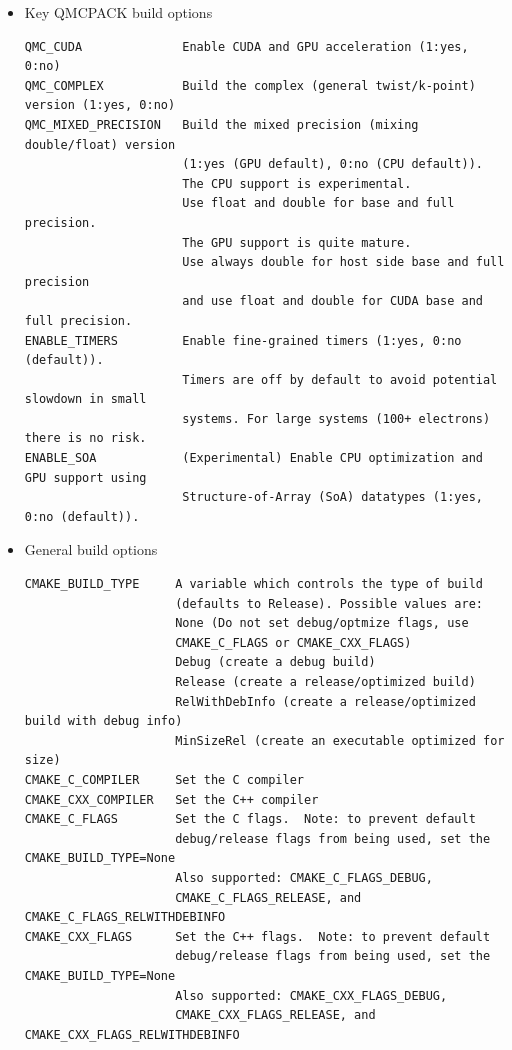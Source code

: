 \begin{itemize}
\item  Key QMCPACK build options
\verbatimfont{\footnotesize}%
\begin{verbatim}
QMC_CUDA              Enable CUDA and GPU acceleration (1:yes, 0:no)
QMC_COMPLEX           Build the complex (general twist/k-point) version (1:yes, 0:no)
QMC_MIXED_PRECISION   Build the mixed precision (mixing double/float) version
                      (1:yes (GPU default), 0:no (CPU default)).
                      The CPU support is experimental.
                      Use float and double for base and full precision.
                      The GPU support is quite mature.
                      Use always double for host side base and full precision
                      and use float and double for CUDA base and full precision.
ENABLE_TIMERS         Enable fine-grained timers (1:yes, 0:no (default)).
                      Timers are off by default to avoid potential slowdown in small
                      systems. For large systems (100+ electrons) there is no risk.
ENABLE_SOA            (Experimental) Enable CPU optimization and GPU support using
                      Structure-of-Array (SoA) datatypes (1:yes, 0:no (default)).
\end{verbatim}

\item General build options
\verbatimfont{\footnotesize}%
\begin{verbatim}
CMAKE_BUILD_TYPE     A variable which controls the type of build
                     (defaults to Release). Possible values are:
                     None (Do not set debug/optmize flags, use
                     CMAKE_C_FLAGS or CMAKE_CXX_FLAGS)
                     Debug (create a debug build)
                     Release (create a release/optimized build)
                     RelWithDebInfo (create a release/optimized build with debug info)
                     MinSizeRel (create an executable optimized for size)
CMAKE_C_COMPILER     Set the C compiler
CMAKE_CXX_COMPILER   Set the C++ compiler
CMAKE_C_FLAGS        Set the C flags.  Note: to prevent default
                     debug/release flags from being used, set the CMAKE_BUILD_TYPE=None
                     Also supported: CMAKE_C_FLAGS_DEBUG,
                     CMAKE_C_FLAGS_RELEASE, and CMAKE_C_FLAGS_RELWITHDEBINFO
CMAKE_CXX_FLAGS      Set the C++ flags.  Note: to prevent default
                     debug/release flags from being used, set the CMAKE_BUILD_TYPE=None
                     Also supported: CMAKE_CXX_FLAGS_DEBUG,
                     CMAKE_CXX_FLAGS_RELEASE, and CMAKE_CXX_FLAGS_RELWITHDEBINFO
\end{verbatim}


\end{itemize}
